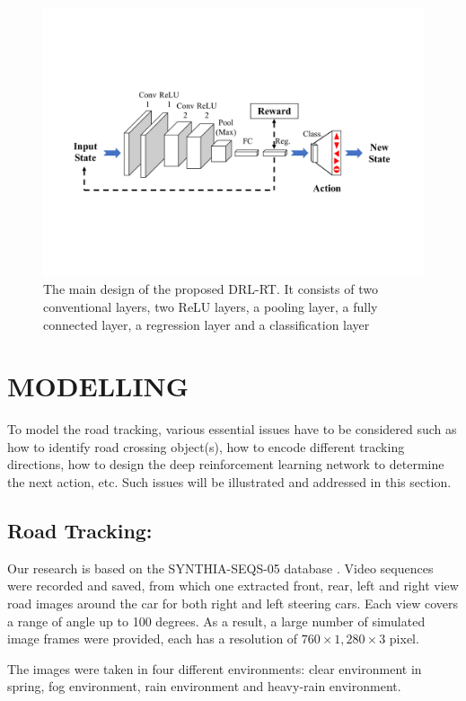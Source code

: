 \documentclass[a4paper,twoside]{article}
\begin{document}
\begin{figure}[!h]
	\centering
	\includegraphics[scale=.65,trim=2cm 5.5cm 2cm 5.5cm,clip]{Deep_Reinf_Net1.pdf}
	\caption{The main design of the proposed DRL-RT. It consists of two conventional layers, two ReLU layers, a pooling layer, a fully connected layer, a regression layer and a classification layer}
	\label{Fig:Deep_Reinf_Net}
\end{figure}
\section{\uppercase{Modelling}}
To model the road tracking, various essential issues have to be considered such as how to identify road crossing object(s), how to encode different tracking directions, how to design the deep reinforcement learning network to determine the next action, etc. Such issues will be illustrated and addressed in this section.

\subsection{Road Tracking:} 
Our research is based on the SYNTHIA-SEQS-05 database \cite{Ros2016TheSYNTHIA}. Video sequences were recorded and saved, from which one extracted front,  rear, left and right view road images around the car for both right and left steering cars. Each view covers a range of angle up to 100 degrees. As a result, a large number of simulated image frames were provided, each has a resolution of $760 \times 1,280 \times 3$ pixel. 

The images were taken in four different environments: clear
environment in spring, fog environment, rain environment and
heavy-rain environment.
\end{document}
